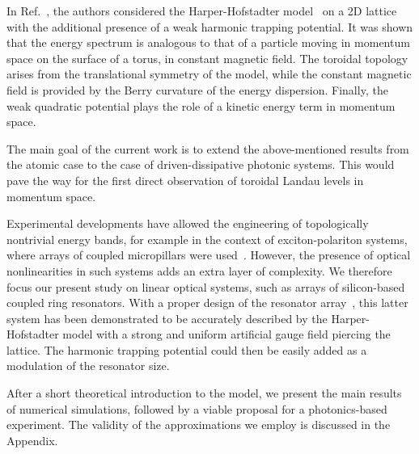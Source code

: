 \documentclass[twocolumn, 10pt, aps, superscriptaddress, floatfix, showpacs, prb, citeautoscript]{revtex4-1}
\newcommand{\co}[2]{#2}
\renewcommand{\paragraph}{\co}
\begin{document}
\paragraph{Momentum space dual of HH model provides new insights.}
In Ref.~, the authors considered the
Harper-Hofstadter model~\cite{hofstadter1976butterfly} on a 2D lattice
with the additional presence of a weak harmonic trapping potential. It
was shown that the energy spectrum is analogous to that of a particle
moving in momentum space on the surface of a torus, in constant
magnetic field.  The toroidal topology arises from the translational
symmetry of the model, while the constant magnetic field is provided
by the Berry curvature of the energy dispersion. Finally, the weak
quadratic potential plays the role of a kinetic energy term in
momentum space.

\paragraph{The main goal and its importance.}
The main goal of the current work is to extend the above-mentioned
results from the atomic case to the case of driven-dissipative
photonic systems. This would pave the way for the first direct
observation of toroidal Landau levels in momentum space.


\paragraph{Hafezi's arrays could be used for HH physics.}
Experimental developments have allowed the engineering of
topologically nontrivial energy bands, for example in the context of
exciton-polariton systems, where arrays of coupled micropillars were
used~\cite{jacqmin2014dirac}. However, the presence of optical
nonlinearities in such systems adds an extra layer of complexity.  We
therefore focus our present study on linear optical systems, such as
arrays of silicon-based coupled ring resonators.  With a proper design
of the resonator array~\cite{hafezi2013imaging}, this latter system
has been demonstrated to be accurately described by the
Harper-Hofstadter model with a strong and uniform artificial gauge
field piercing the lattice.  The harmonic trapping potential could
then be easily added as a modulation of the resonator size.


\paragraph{Summary of the manuscript}
After a short theoretical introduction to the model, we present the
main results of numerical simulations, followed by a viable proposal
for a photonics-based experiment. The validity of the approximations
we employ is discussed in the Appendix.
\end{document}
